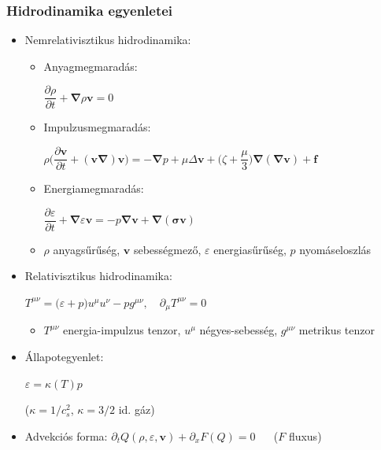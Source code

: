 \documentclass{beamer}
\begin{document}
\begin{frame}
\frametitle{Hidrodinamika egyenletei}
\begin{itemize}
\item<1-> Nemrelativisztikus hidrodinamika:
\begin{itemize}
\item<1-> Anyagmegmaradás:\quad \begin{large}$\dfrac{\partial \rho}{\partial t} + \bm{\nabla}\rho\bm{v}=0$\end{large}
\item<1-> Impulzusmegmaradás:\quad \begin{center}\begin{large}$\rho\Big(\dfrac{\partial \bm{v}}{\partial t}+(\bm{v\nabla})\bm{v}\Big)=-\bm{\nabla}p +\mu\Delta\bm{v}+\Big(\zeta+\dfrac{\mu}{3}\Big)\bm{\nabla}(\bm{\nabla v})+\bm{f}$\end{large}\end{center}
\item<1-> Energiamegmaradás: \quad\begin{large}$\dfrac{\partial \varepsilon}{\partial t}+\bm{\nabla}\varepsilon\bm{v}=-p\bm{\nabla v}+\bm{\nabla(\sigma v)}$\end{large}
\item<1-> $\rho$ anyagsűrűség, $\bm{v}$ sebességmező, $\varepsilon$ energiasűrűség, $p$ nyomáseloszlás
\end{itemize}

\item<1-> Relativisztikus hidrodinamika:
\begin{Large}
\begin{center}$T^{\mu\nu}=\big(\varepsilon+p\big)u^\mu u^\nu-pg^{\mu\nu},\quad \partial_\mu T^{\mu\nu}=0$\end{center}
\end{Large}
\begin{itemize}
\item<1-> $T^{\mu\nu}$ energia-impulzus tenzor, $u^\mu$ négyes-sebesség, $g^{\mu\nu}$ metrikus tenzor
\end{itemize}

\item<1-> Állapotegyenlet:\quad \begin{large}$\varepsilon=\kappa(T)p\quad$\end{large} ($\kappa=1/c_s^2$, $\kappa=3/2$ id. gáz)

\item<1-> Advekciós forma: $\partial_t Q(\rho, \varepsilon, \bm{v})+\partial_x F(Q)=0$ $\quad$ ($F$ fluxus)

\end{itemize}
\end{frame}
\end{document}
